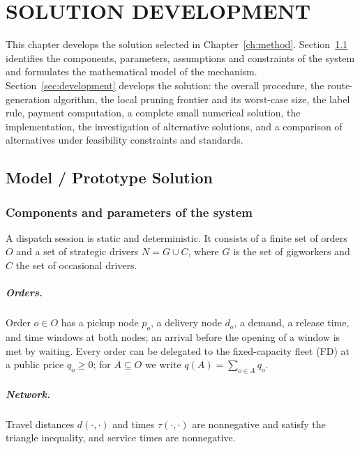 \chapter{SOLUTION DEVELOPMENT}
\label{ch:solution}

This chapter develops the solution selected in Chapter~\ref{ch:method}.
Section~\ref{sec:model} identifies the components, parameters, assumptions
and constraints of the system and formulates the mathematical model of the
mechanism. Section~\ref{sec:development} develops the solution: the overall
procedure, the route-generation algorithm, the local pruning frontier and its
worst-case size, the label rule, payment computation, a complete small
numerical solution, the implementation, the investigation of alternative
solutions, and a comparison of alternatives under feasibility constraints and
standards.

\section{Model / Prototype Solution}
\label{sec:model}

\subsection{Components and parameters of the system}

A dispatch session is static and deterministic. It consists of a finite set
of orders $O$ and a set of strategic drivers $N=G\cup C$, where $G$ is the
set of gigworkers and $C$ the set of occasional drivers.

\paragraph{Orders.} Order $o\in O$ has a pickup node $p_o$, a delivery node
$d_o$, a demand, a release time, and time windows at both nodes; an arrival
before the opening of a window is met by waiting. Every order can be
delegated to the fixed-capacity fleet (FD) at a public price $q_o\ge0$; for
$A\subseteq O$ we write $q(A)=\sum_{o\in A}q_o$.

\paragraph{Network.} Travel distances $d(\cdot,\cdot)$ and times
$\tau(\cdot,\cdot)$ are nonnegative and satisfy the triangle inequality, and
service times are nonnegative.

